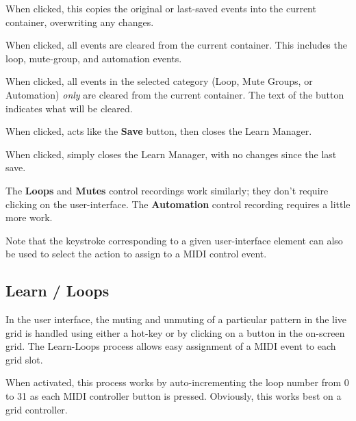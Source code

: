    When clicked, this copies the original or last-saved events into
   the current container, overwriting any changes.

   When clicked, all events are cleared from the current container.
   This includes the loop, mute-group, and automation events.

   When clicked, all events in the selected category
   (Loop, Mute Groups, or Automation) \textsl{only}
   are cleared from the current container.
   The text of the button indicates what will be cleared.

   When clicked, acts like the \textbf{Save} button, then closes
   the Learn Manager.

   When clicked, simply closes the Learn Manager, with no changes
   since the last save.

   The \textbf{Loops} and \textbf{Mutes} control recordings work similarly;
   they don't require clicking on the user-interface.
   The \textbf{Automation} control recording requires a little more
   work.

   Note that the keystroke corresponding to a given user-interface element
   can also be used to select the action to assign to a MIDI control event.

\subsection{Learn / Loops}
\label{subsec:midi_learn_loops}

   In the user interface, the muting and unmuting of a particular pattern in
   the live grid is handled using either a hot-key or by clicking on a
   button in the on-screen grid.
   The Learn-Loops process allows easy assignment of a MIDI event
   to each grid slot.

   When activated, this process works by auto-incrementing the loop number
   from 0 to 31 as each MIDI controller button is pressed.
   Obviously, this works best on a grid controller.

